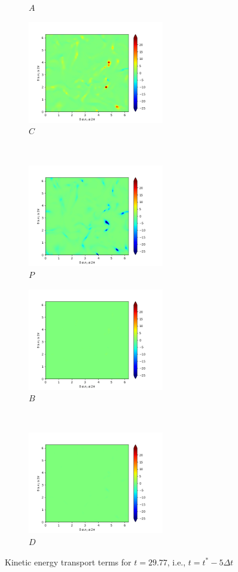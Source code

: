\begin{figure}[H]
\begin{subfigure}{0.45\textwidth}
        \caption{$A$}
    \end{subfigure}
    \newline
    \begin{subfigure}{0.45\textwidth}
        \includegraphics[height=1.75in]{media/run-cds-65/C-ke-1335.png}
        \caption{$C$}
    \end{subfigure}
    ~
    \begin{subfigure}{0.45\textwidth}
        \includegraphics[height=1.75in]{media/run-cds-65/P-ke-1335.png}
        \caption{$P$}
    \end{subfigure}
    \newline
    \begin{subfigure}{0.45\textwidth}
        \includegraphics[height=1.75in]{media/run-cds-65/B-ke-1335.png}
        \caption{$B$}
    \end{subfigure}
    ~
    \begin{subfigure}{0.45\textwidth}
        \includegraphics[height=1.75in]{media/run-cds-65/D-ke-1335.png}
        \caption{$D$}
    \end{subfigure}
    \caption{Kinetic energy transport terms for $t=29.77$, i.e., $t=t^{\ast} -5 \Delta t$}
\end{figure}

